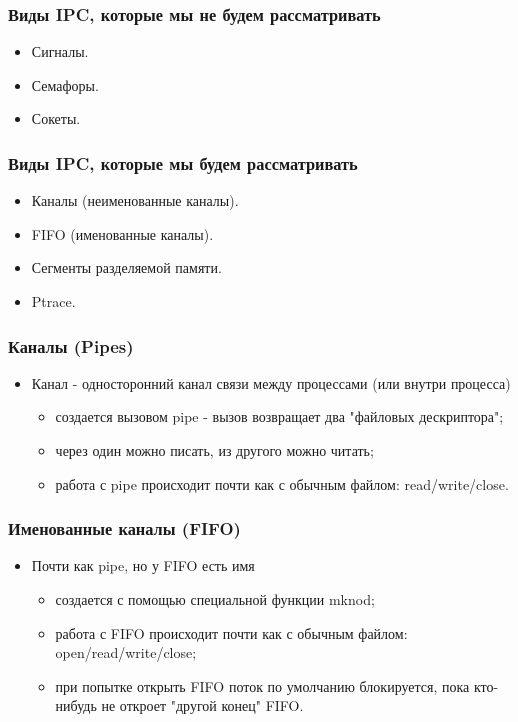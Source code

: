 \begin{frame}
\frametitle{Виды IPC, которые мы не будем рассматривать}
\begin{itemize}
    \item<1->Сигналы.
    \item<3->Семафоры.
    \item<4->Сокеты.
\end{itemize}
\end{frame}

\begin{frame}
\frametitle{Виды IPC, которые мы будем рассматривать}
\begin{itemize}
    \item<1->Каналы (неименованные каналы).
    \item<2->FIFO (именованные каналы).
    \item<3->Сегменты разделяемой памяти.
    \item<4->Ptrace.
\end{itemize}
\end{frame}

\begin{frame}
\frametitle{Каналы (Pipes)}
\begin{itemize}
    \item<1->Канал - односторонний канал связи между процессами (или внутри
         процесса)
    \begin{itemize}
        \item<2->создается вызовом pipe - вызов возвращает два "файловых
             дескриптора";
        \item<3->через один можно писать, из другого можно читать;
        \item<4->работа с pipe происходит почти как с обычным файлом:
             read/write/close.
    \end{itemize}
\end{itemize}
\end{frame}

\begin{frame}
\frametitle{Именованные каналы (FIFO)}
\begin{itemize}
    \item<1->Почти как pipe, но у FIFO есть имя
    \begin{itemize}
        \item<2->создается с помощью специальной функции mknod;
        \item<3->работа с FIFO происходит почти как с обычным файлом:
             open/read/write/close;
        \item<4->при попытке открыть FIFO поток по умолчанию блокируется,
             пока кто-нибудь не откроет "другой конец" FIFO.
    \end{itemize}
\end{itemize}
\end{frame}

